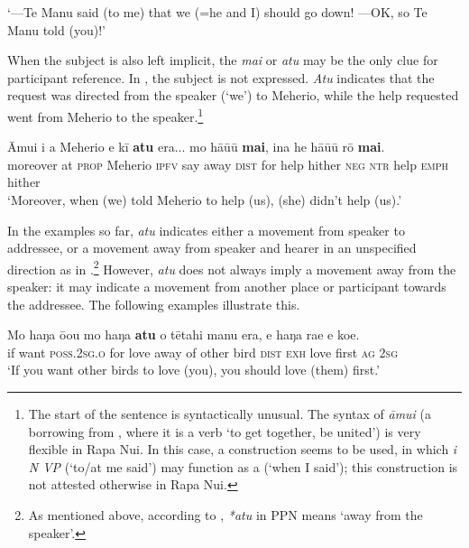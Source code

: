 \glt
‘—Te Manu said (to me) that we (=he and I) should go down! —OK, so Te Manu told (you)!’ \textstyleExampleref{[R245.221]} 
\z

When the subject is also left implicit, the  \textit{mai} or \textit{atu} may be the only clue for participant reference. In , the subject is not expressed. \textit{Atu} indicates that the request was directed from the speaker (‘we’) to Meherio, while the help requested went from Meherio to the speaker.\footnote{\label{fn:352}The start of the sentence is syntactically unusual. The syntax of \textit{{\ꞌ}āmui} (a borrowing from , where it is a verb ‘to get together, be united’) is very flexible in Rapa Nui. In this case, a  construction seems to be used, in which \textit{i N VP} (‘to/at me said’) may function as a  (‘when I said’); this construction is not attested otherwise in Rapa Nui.}

\ea\label{ex:7.131}
\gll {\ꞌ}Āmui i a Meherio e kī \textbf{atu} era... mo hā{\ꞌ}ū{\ꞌ}ū \textbf{mai},  {\ꞌ}ina he hā{\ꞌ}ū{\ꞌ}ū rō \textbf{mai}.\\
moreover at \textsc{prop} Meherio \textsc{ipfv} say away \textsc{dist} for help hither  \textsc{neg} \textsc{ntr} help \textsc{emph} hither\\

\glt 
‘Moreover, when (we) told Meherio to help (us), (she) didn’t help (us).’ \textstyleExampleref{[R315.031]} 
\z

In the examples so far, \textit{atu} indicates either a movement from speaker to addressee, or a movement away from speaker and hearer in an unspecified direction as in .\footnote{\label{fn:353}As mentioned above, according to \citet[34]{Clark1976}, \textit{*atu} in PPN means ‘away from the speaker’.} However, \textit{atu} does not always imply a movement away from the speaker: it may indicate a movement from another place or participant towards the addressee. The following examples illustrate this.

\ea\label{ex:7.132}
\gll Mo haŋa ō{\ꞌ}ou mo haŋa \textbf{atu} o tētahi manu era, e haŋa ra{\ꞌ}e e koe. \\
if want \textsc{poss.2sg.o} for love away of other bird \textsc{dist} \textsc{exh} love first \textsc{ag} \textsc{2sg} \\

\glt 
‘If you want other birds to love (you), you should love (them) first.’ \textstyleExampleref{[R213.050]} 
\z

